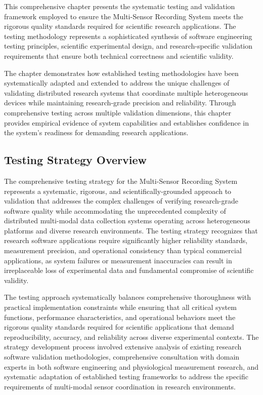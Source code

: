\documentclass[11pt,a4paper]{report}
\begin{document}
This comprehensive chapter presents the systematic testing and validation framework employed to ensure the Multi-Sensor
Recording System meets the rigorous quality standards required for scientific research applications. The testing
methodology represents a sophisticated synthesis of software engineering testing principles, scientific experimental
design, and research-specific validation requirements that ensure both technical correctness and scientific validity.

The chapter demonstrates how established testing methodologies have been systematically adapted and extended to address
the unique challenges of validating distributed research systems that coordinate multiple heterogeneous devices while
maintaining research-grade precision and reliability. Through comprehensive testing across multiple validation
dimensions, this chapter provides empirical evidence of system capabilities and establishes confidence in the system's
readiness for demanding research applications.

\subsection{Testing Strategy Overview}

The comprehensive testing strategy for the Multi-Sensor Recording System represents a systematic, rigorous, and
scientifically-grounded approach to validation that addresses the complex challenges of verifying research-grade
software quality while accommodating the unprecedented complexity of distributed multi-modal data collection systems
operating across heterogeneous platforms and diverse research environments. The testing strategy recognizes that
research software applications require significantly higher reliability standards, measurement precision, and
operational consistency than typical commercial applications, as system failures or measurement inaccuracies can result
in irreplaceable loss of experimental data and fundamental compromise of scientific validity.

The testing approach systematically balances comprehensive thoroughness with practical implementation constraints while
ensuring that all critical system functions, performance characteristics, and operational behaviors meet the rigorous
quality standards required for scientific applications that demand reproducibility, accuracy, and reliability across
diverse experimental contexts. The strategy development process involved extensive analysis of existing research
software validation methodologies, comprehensive consultation with domain experts in both software engineering and
physiological measurement research, and systematic adaptation of established testing frameworks to address the specific
requirements of multi-modal sensor coordination in research environments.
\end{document}
